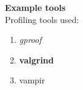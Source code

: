 \textbf{Example tools}\\
Profiling tools used:
\begin{enumerate}
  \item \textit{gproof}
  \item \textbf{valgrind}
  \item vampir
\end{enumerate}
